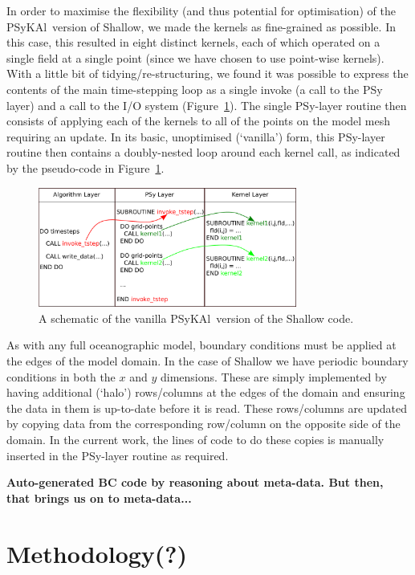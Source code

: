 \documentclass[journal]{IEEEtran}
\newcommand{\psykal}{{PS}y{KA}l\ }
\begin{document}
In order to maximise the flexibility (and thus potential for
optimisation) of the \psykal version of Shallow, we made the kernels
as fine-grained as possible. In this case, this resulted in eight
distinct kernels, each of which operated on a single field at a single
point (since we have chosen to use point-wise kernels). With a little
bit of tidying/re-structuring, we found it was possible to express the
contents of the main time-stepping loop as a single invoke (a call to
the PSy layer) and a call to the I/O system
(Figure~\ref{FIG_psykal_shallow_structure}). The single PSy-layer
routine then consists of applying each of the kernels to all of the
points on the model mesh requiring an update. In its basic,
unoptimised (`vanilla') form, this PSy-layer routine then contains a
doubly-nested loop around each kernel call, as indicated by the
pseudo-code in Figure~\ref{FIG_psykal_shallow_structure}.

\begin{figure}
\centering
\includegraphics[width=85mm]{psykal_shallow}
\caption{A schematic of the vanilla \psykal version of the Shallow code.}
\label{FIG_psykal_shallow_structure}
\end{figure}

As with any full oceanographic model, boundary conditions must be
applied at the edges of the model domain. In the case of Shallow we
have periodic boundary conditions in both the $x$ and $y$ dimensions.
These are simply implemented by having additional (`halo')
rows/columns at the edges of the domain and ensuring the data in them
is up-to-date before it is read. These rows/columns are updated by
copying data from the corresponding row/column on the opposite side of
the domain. In the current work, the lines of code to do these copies
is manually inserted in the PSy-layer routine as required.

{\bf Auto-generated BC code by reasoning about meta-data. But then,
  that brings us on to meta-data...}

\section{Methodology(?)}
\end{document}
